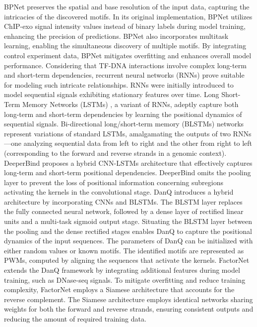 \documentclass[a4paper, titlepage, openright]{book}
\begin{document}
BPNet preserves the spatial and base resolution of the input data, capturing the intricacies of the discovered motifs. In its original implementation, BPNet utilizes ChIP-exo signal intensity values instead of binary labels during model training, enhancing the precision of predictions. BPNet also incorporates multitask learning, enabling the simultaneous discovery of multiple motifs. By integrating control experiment data, BPNet mitigates overfitting and enhances overall model performance. Considering that TF-DNA interactions involve complex long-term and short-term dependencies, recurrent neural networks (RNNs) prove suitable for modeling such intricate relationships. RNNs were initially introduced to model sequential signals exhibiting stationary features over time. Long Short-Term Memory Networks (LSTMs) \citep{hochreiter1997long}, a variant of RNNs, adeptly capture both long-term and short-term dependencies by learning the positional dynamics of sequential signals. Bi-directional long/short-term memory (BLSTMs) networks represent variations of standard LSTMs, amalgamating the outputs of two RNNs—one analyzing sequential data from left to right and the other from right to left (corresponding to the forward and reverse strands in a genomic context). DeeperBind \citep{hassanzadeh2016deeperbind} proposes a hybrid CNN-LSTMs architecture that effectively captures long-term and short-term positional dependencies. DeeperBind omits the pooling layer to prevent the loss of positional information concerning subregions activating the kernels in the convolutional stage. DanQ \citep{quang2016danq} introduces a hybrid architecture by incorporating CNNs and BLSTMs. The BLSTM layer replaces the fully connected neural network, followed by a dense layer of rectified linear units and a multi-task sigmoid output stage. Situating the BLSTM layer between the pooling and the dense rectified stages enables DanQ to capture the positional dynamics of the input sequences. The parameters of DanQ can be initialized with either random values or known motifs. The identified motifs are represented as PWMs, computed by aligning the sequences that activate the kernels. FactorNet \citep{quang2019factornet} extends the DanQ framework by integrating additional features during model training, such as DNase-seq signals. To mitigate overfitting and reduce training complexity, FactorNet employs a Siamese architecture that accounts for the reverse complement. The Siamese architecture employs identical networks sharing weights for both the forward and reverse strands, ensuring consistent outputs and reducing the amount of required training data.
\end{document}
